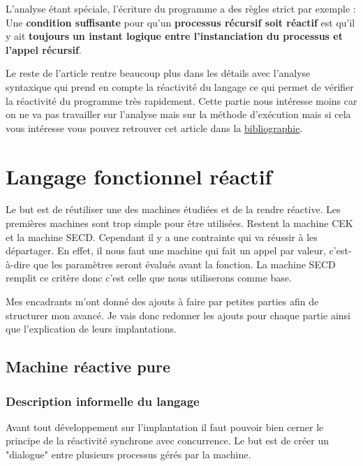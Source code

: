 \documentclass[10pt,a4paper]{report}
\begin{document}
	
	L'analyse étant spéciale, l'écriture du programme a des règles strict par exemple :
	Une \textbf{condition suffisante} pour qu'un \textbf{processus r\'{e}cursif soit r\'{e}actif} est qu'il y ait \textbf{toujours} \textbf{un instant logique entre l'instanciation du processus et l'appel r\'{e}cursif}.
	\bigbreak
	
	
	Le reste de l'article rentre beaucoup plus dans les détails avec l'analyse syntaxique qui prend en compte la réactivité du langage ce qui permet de vérifier la réactivité du programme très rapidement. Cette partie nous intéresse moins car on ne va pas travailler sur l'analyse mais sur la méthode d'exécution mais si cela vous intéresse vous pouvez retrouver cet article dans la \hyperref[biblio]{bibliographie}.
	
	
	\chapter{Langage fonctionnel réactif}\label{SECDConc4}
	
	Le but est de réutiliser une des machines étudiées et de la rendre réactive. Les premières machines sont trop simple pour être utilisées. Restent la machine CEK et la machine SECD. Cependant il y a une contrainte qui va réussir à les départager. En effet, il nous faut une machine qui fait un appel par valeur, c'est-à-dire que les paramètres seront évalués avant la fonction. La machine SECD remplit ce critère donc c'est celle que nous utiliserons comme base.
	\medbreak
	
	Mes encadrants m'ont donné des ajouts à faire par petites parties afin de structurer mon avancé. Je vais donc redonner les ajouts pour chaque partie ainsi que l'explication de leurs implantations.
	\bigbreak
	
	
	\section{Machine réactive pure}
	
	\subsection{Description informelle du langage}
	
	Avant tout développement sur l'implantation il faut pouvoir bien cerner le principe de la réactivité synchrone avec concurrence. Le but est de créer un "dialogue" entre plusieurs processus gérés par la machine. 
	\medbreak
	
\end{document}
